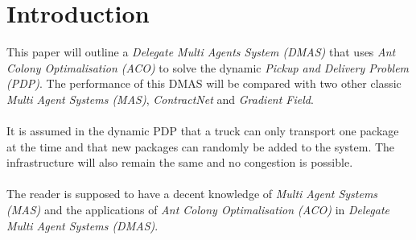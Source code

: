 \section{Introduction}
\label{sec:intro}


This paper will outline a \textit{Delegate Multi Agents System (DMAS)} that uses \textit{Ant Colony Optimalisation (ACO)} to solve the dynamic \textit{Pickup and Delivery Problem (PDP)}. The performance of this DMAS will be compared with two other classic \textit{Multi Agent Systems (MAS)}, \textit{ContractNet} and \textit{Gradient Field}.
\\
\\
It is assumed in the dynamic PDP that a truck can only transport one package at the time and that new packages can randomly be added to the system. The infrastructure will also remain the same and no congestion is possible.
\\
\\
The reader is supposed to have a decent knowledge of \textit{Multi Agent Systems (MAS)} and the applications of \textit{Ant Colony Optimalisation (ACO)} in \textit{Delegate Multi Agent Systems (DMAS)}.

